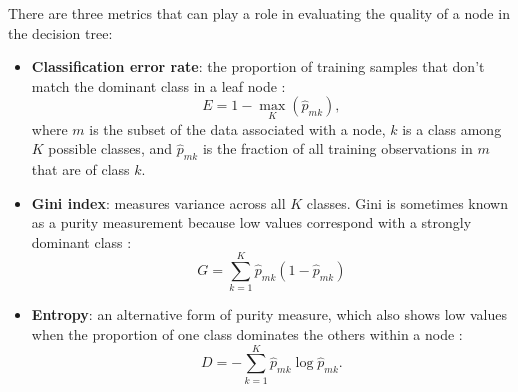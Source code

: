 There are three metrics that can play a role in evaluating the quality of a node in the decision tree:
\begin{itemize}[itemsep=2pt]\label{ch3:impurity}
    \item \textbf{Classification error rate}: the proportion of training samples that don't match the dominant class in a leaf node \citep[p.\ 312]{james_introduction_2013}:
    \begin{equation}
    \label{eq:error_rate}
        E = 1 - \max_K(\hat{p}_{mk}),
    \end{equation}
    where $m$ is the subset of the data associated with a node, $k$ is a class among $K$ possible classes, and $\hat{p}_{mk}$ is the fraction of all training observations in $m$ that are of class $k$.
    
    \item \textbf{Gini index}: measures variance across all $K$ classes. Gini is sometimes known as a purity measurement because low values correspond with a strongly dominant class \citep[p.\ 312]{james_introduction_2013}:
    \begin{equation}
    \label{eq:gini}
        G = \sum_{k=1}^{K}{\hat{p}_{mk}(1-\hat{p}_{mk})}
    \end{equation}
    
    \item \textbf{Entropy}: an alternative form of purity measure, which also shows low values when the proportion of one class dominates the others within a node \citep[p.\ 312]{james_introduction_2013}:
    \begin{equation}
    \label{eq:entropy}
        D = -\sum_{k=1}^{K}\hat{p}_{mk} \log\hat{p}_{mk}.
    \end{equation}
\end{itemize}

